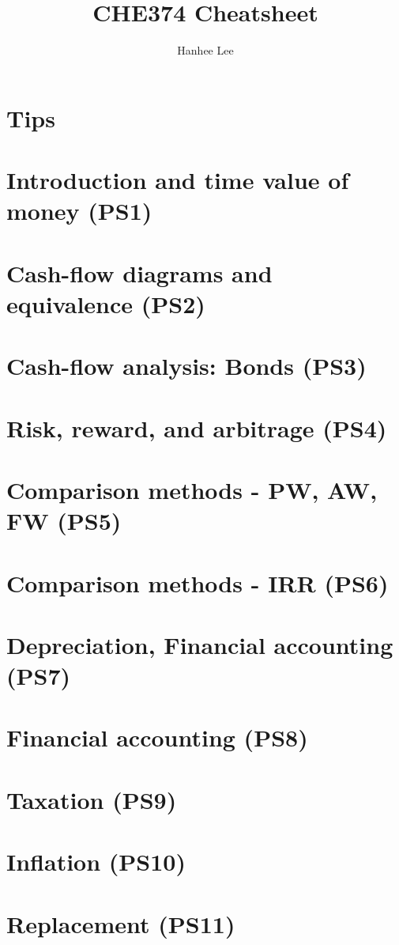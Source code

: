 \documentclass{article}
\title{CHE374 Cheatsheet}
\author{Hanhee Lee}
\begin{document}
\maketitle

\tableofcontents

\listoffigures

\listoftables

\section{Tips}
\begin{intuition}

\end{intuition}

\section{Introduction and time value of money (PS1)}


\section{Cash-flow diagrams and equivalence (PS2)}


\section{Cash-flow analysis: Bonds (PS3)}


\section{Risk, reward, and arbitrage (PS4)} %


\section{Comparison methods - PW, AW, FW (PS5)}


\section{Comparison methods - IRR (PS6)}


\section{Depreciation, Financial accounting (PS7)}


\section{Financial accounting (PS8)}


\section{Taxation (PS9)}


\section{Inflation (PS10)}


\section{Replacement (PS11)}

\end{document}

